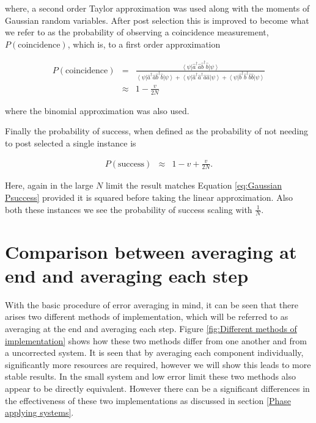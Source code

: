 \documentclass[aps,pra,twocolumn,superscriptaddress,numerical]{revtex4-1}
\begin{document}
		
		where, a second order Taylor approximation was used along with the moments of Gaussian random variables. After post selection this is improved to become what we refer to as the probability of observing a coincidence measurement, $P(\textrm{coincidence})$, which is, to a first order approximation
		
		\begin{widetext}
			\begin{eqnarray}
				P(\textrm{coincidence}) & = & \frac{\left\langle \psi\right|\hat{a}^{\dagger}\hat{a}\hat{b}^{\dagger}\hat{b}\left|\psi\right\rangle }{\left\langle \psi\right|\hat{a}^{\dagger}\hat{a}\hat{b}^{\dagger}\hat{b}\left|\psi\right\rangle +{}\left\langle \psi\right|\hat{a}^{\dagger}\hat{a}^{\dagger}\hat{a}\hat{a}\left|\psi\right\rangle +{}\left\langle \psi\right|\hat{b}^{\dagger}\hat{b}^{\dagger}\hat{b}\hat{b}\left|\psi\right\rangle }\nonumber \\
				& \approx & 1-\frac{v}{2N}\label{eq:2pNarb PS}
			\end{eqnarray}
		\end{widetext}
		
		where the binomial approximation was also used.
		
		Finally the probability of success, when defined as the probability of not needing to post selected a single instance is
		
		
		\begin{eqnarray}
			P(\textrm{success}) & \approx & 1-v+\frac{v}{2N}.\label{eq:2pNarb Success}
		\end{eqnarray}
	
		Here, again in the large $N$ limit the result matches Equation \ref{eq:Gaussian Psuccess} provided it is squared before taking the linear approximation. Also both these instances we see the probability of success scaling with $\frac{1}{N}$.
		
	\section{Comparison between averaging at end and averaging each step\label{averaging at end vs step}}
	
		With the basic procedure of error averaging in mind, it can be seen	that there arises two different methods of implementation, which will be referred to as averaging at the end and averaging each step. Figure \ref{fig:Different methods of implementation} shows how these two methods differ from one another and from a uncorrected	system. It is seen that by averaging each component individually, significantly more resources are required, however we will show this leads to more stable results. In the small system and low error limit these two methods also appear to be directly equivalent. However there can be a significant differences in the effectiveness of these two implementations as discussed in section \ref{Phase applying systems}.
	
\end{document}
